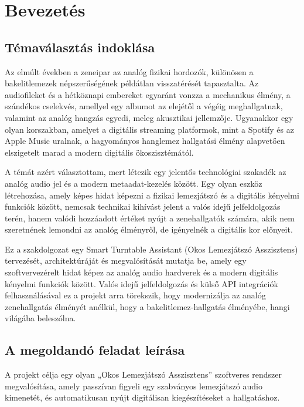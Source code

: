 
\chapter{Bevezetés}

\section{Témaválasztás indoklása}
Az elmúlt években a zeneipar az analóg fizikai hordozók, különösen a bakelitlemezek népszerűségének példátlan visszatérését tapasztalta. Az audiofileket és a hétköznapi embereket egyaránt vonzza a mechanikus élmény, a szándékos cselekvés, amellyel egy albumot az elejétől a végéig meghallgatnak, valamint az analóg hangzás egyedi, meleg akusztikai jellemzője. Ugyanakkor egy olyan korszakban, amelyet a digitális streaming platformok, mint a Spotify és az Apple Music uralnak, a hagyományos hanglemez hallgatási élmény alapvetően elszigetelt marad a modern digitális ökoszisztémától.

A témát azért választottam, mert létezik egy jelentős technológiai szakadék az analóg audio jel és a modern metaadat-kezelés között. Egy olyan eszköz létrehozása, amely képes hidat képezni a fizikai lemezjátszó és a digitális kényelmi funkciók között, nemcsak technikai kihívást jelent a valós idejű jelfeldolgozás terén, hanem valódi hozzáadott értéket nyújt a zenehallgatók számára, akik nem szeretnének lemondni az analóg élményről, de igényelnék a digitális kor előnyeit.

Ez a szakdolgozat egy Smart Turntable Assistant (Okos Lemezjátszó Asszisztens) tervezését, architektúráját és megvalósítását mutatja be, amely egy szoftvervezérelt hidat képez az analóg audio hardverek és a modern digitális kényelmi funkciók között. Valós idejű jelfeldolgozás és külső API integrációk felhasználásával ez a projekt arra törekszik, hogy modernizálja az analóg zenehallgatás élményét anélkül, hogy a bakelitlemez-hallgatás élményébe, hangi világába beleszólna.

\section{A megoldandó feladat leírása}
A projekt célja egy olyan „Okos Lemezjátszó Asszisztens” szoftveres rendszer megvalósítása, amely passzívan figyeli egy szabványos lemezjátszó audio kimenetét, és automatikusan nyújt digitálisan kiegészítéseket a hallgatáshoz.

